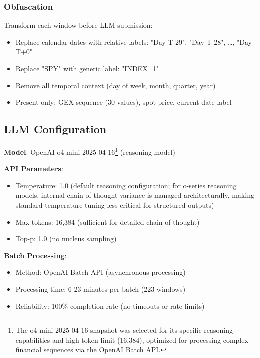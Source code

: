 \subsubsection{Obfuscation}

Transform each window before LLM submission:
\begin{itemize}
\item Replace calendar dates with relative labels: "Day T-29", "Day T-28", \ldots, "Day T+0"
\item Replace "SPY" with generic label: "INDEX\_1"
\item Remove all temporal context (day of week, month, quarter, year)
\item Present only: GEX sequence (30 values), spot price, current date label
\end{itemize}

\subsection{LLM Configuration}

\textbf{Model}: OpenAI o4-mini-2025-04-16\footnote{The o4-mini-2025-04-16 snapshot was selected for its specific reasoning capabilities and high token limit (16,384), optimized for processing complex financial sequences via the OpenAI Batch API.} (reasoning model)

\textbf{API Parameters}:
\begin{itemize}
\item Temperature: 1.0 (default reasoning configuration; for o-series reasoning models, internal chain-of-thought variance is managed architecturally, making standard temperature tuning less critical for structured outputs)
\item Max tokens: 16,384 (sufficient for detailed chain-of-thought)
\item Top-p: 1.0 (no nucleus sampling)
\end{itemize}

\textbf{Batch Processing}:
\begin{itemize}
\item Method: OpenAI Batch API (asynchronous processing)
\item Processing time: 6-23 minutes per batch (223 windows)
\item Reliability: 100\% completion rate (no timeouts or rate limits)
\end{itemize}

